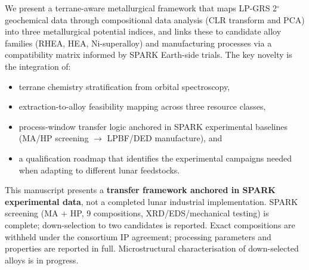 \documentclass[11pt,a4paper]{article}
\begin{document}
We present a terrane-aware metallurgical framework that maps LP-GRS 2$^\circ$ geochemical data through compositional data analysis (CLR transform and PCA) into three metallurgical potential indices, and links these to candidate alloy families (RHEA, HEA, Ni-superalloy) and manufacturing processes via a compatibility matrix informed by SPARK Earth-side trials. The key novelty is the integration of:
\begin{itemize}[leftmargin=1.4em]
  \item terrane chemistry stratification from orbital spectroscopy,
  \item extraction-to-alloy feasibility mapping across three resource classes,
  \item process-window transfer logic anchored in SPARK experimental baselines (MA/HP screening $\rightarrow$ LPBF/DED manufacture), and
  \item a qualification roadmap that identifies the experimental campaigns needed when adapting to different lunar feedstocks.
\end{itemize}

\begin{keyhighlight}
This manuscript presents a \textbf{transfer framework anchored in SPARK experimental data}, not a completed lunar industrial implementation. SPARK screening (MA + HP, 9 compositions, XRD/EDS/mechanical testing) is complete; down-selection to two candidates is reported. Exact compositions are withheld under the consortium IP agreement; processing parameters and properties are reported in full. Microstructural characterisation of down-selected alloys is in progress.
\end{keyhighlight}
\end{document}
